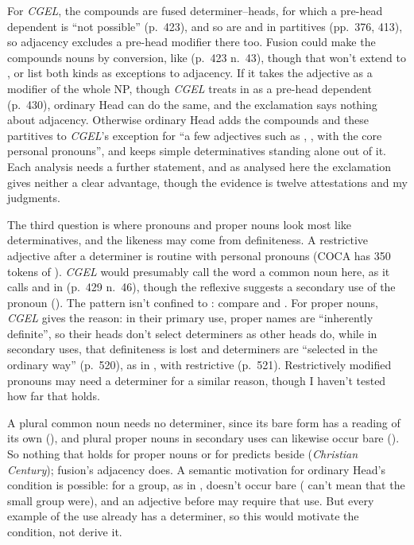 For \textit{CGEL}, the compounds are fused determiner--heads, for which a pre-head dependent is \enquote{not possible} (p.~423), and so are  and  in partitives (pp.~376, 413), so adjacency excludes a pre-head modifier there too. Fusion could make the compounds nouns by conversion, like  (p.~423 n.~43), though that won't extend to , or list both kinds as exceptions to adjacency. If it takes the adjective as a modifier of the whole NP, though \textit{CGEL} treats  in  as a pre-head dependent (p.~430), ordinary Head can do the same, and the exclamation says nothing about adjacency. Otherwise ordinary Head adds the compounds and these partitives to \textit{CGEL}'s exception for \enquote{a few adjectives such as , ,  with the core personal pronouns}, and keeps simple determinatives standing alone out of it. Each analysis needs a further statement, and as analysed here the exclamation gives neither a clear advantage, though the evidence is twelve attestations and my judgments.

The third question is where pronouns and proper nouns look most like determinatives, and the likeness may come from definiteness. A restrictive adjective after a determiner is routine with personal pronouns (COCA has 350 tokens of ). \textit{CGEL} would presumably call the word a common noun here, as it calls  and  in  (p.~429 n.~46), though the reflexive suggests a secondary use of the pronoun (). The pattern isn't confined to : compare  and . For proper nouns, \textit{CGEL} gives the reason: in their primary use, proper names are \enquote{inherently definite}, so their heads don't select determiners as other heads do, while in secondary uses, that definiteness is lost and determiners are \enquote{selected in the ordinary way} (p.~520), as in , with  restrictive (p.~521). Restrictively modified pronouns may need a determiner for a similar reason, though I haven't tested how far that holds.

A plural common noun needs no determiner, since its bare form has a reading of its own (), and plural proper nouns in secondary uses can likewise occur bare (). So nothing that holds for proper nouns or for  predicts  beside  (\textit{Christian Century}); fusion's adjacency does. A semantic motivation for ordinary Head's condition is possible:  for a group, as in , doesn't occur bare ( can't mean that the small group were), and an adjective before  may require that use. But every example of the use already has a determiner, so this would motivate the condition, not derive it.

